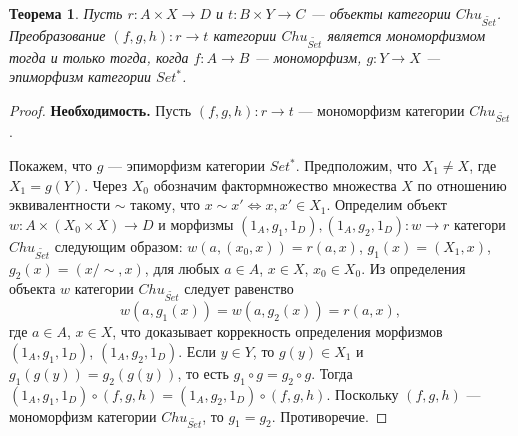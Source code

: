 \documentclass[a4paper,12pt]{article}
\newtheorem{theorem}{Теорема}
\begin{document}
\begin{theorem}\label{monomorphism}
Пусть $r: A \times X \to D$ и $t: B \times Y \to C$ --- объекты категории $Chu_{\widetilde{Set}}$. Преобразование $(f,g,h): r \to t$ категории $Chu_{\widetilde{Set}}$ является мономорфизмом тогда и только тогда, когда $f: A \to B$ --- мономорфизм, $g: Y \to X$ --- эпиморфизм категории $Set^*$.
\end{theorem}
\begin{proof}
    \textbf{Необходимость.} Пусть $(f,g,h): r \to t$ --- мономорфизм категории $Chu_{\widetilde{Set}}$.

    Покажем, что $g$ --- эпиморфизм категории $Set^*$. Предположим, что $X_1 \ne X$, где $X_1 = g(Y)$. Через $X_0$ обозначим фактормножество множества $X$ по отношению эквивалентности $\sim$ такому, что $x \sim x' \Leftrightarrow x,x' \in X_1$. Определим объект $w: A \times (X_0 \times X) \to D$ и морфизмы $(1_A,g_1,1_D), (1_A,g_2,1_D): w \to r$ категори $Chu_{\widetilde{Set}}$ следующим образом: $w(a,(x_0,x)) = r(a,x)$, $g_1(x) = (X_1,x)$, $g_2(x) = (x/\sim, x)$, для любых $a \in A$, $x \in X$, $x_0 \in X_0$. Из определения объекта $w$ категории $Chu_{\widetilde{Set}}$ следует равенство
    $$
        w(a,g_1(x)) = w(a,g_2(x)) = r(a,x),
    $$ 
    где $a \in A$, $x \in X$, что доказывает коррекность определения морфизмов $(1_A,g_1,1_D)$, $(1_A,g_2,1_D)$. Если $y \in Y$, то $g(y) \in X_1$ и $g_1(g(y)) = g_2(g(y))$, то есть $g_1 \circ g = g_2 \circ g$. Тогда $(1_A,g_1,1_D) \circ (f,g,h) = (1_A,g_2,1_D) \circ (f,g,h)$. Поскольку $(f,g,h)$ --- мономорфизм категории $Chu_{\widetilde{Set}}$, то $g_1 = g_2$. Противоречие.



\end{proof}
\end{document}
